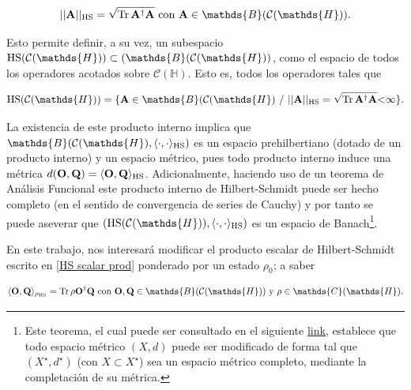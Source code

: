 \documentclass{report} %
\newcommand{\lgg}{\langle}
\newcommand{\rgg}{\rangle}
\numberwithin{equation}{section}
\begin{document}
\begin{equation}
    ||{\bf A}||_{\textnormal{HS}} = \sqrt{\Tr \bf A^{\dagger}{\bf A}} \textnormal{ con } {\bf A} \in \mathds{B}(\mathcal{C}(\mathds{H})).
    \label{HS norm}
\end{equation}

Esto permite definir, a su vez, un subespacio \cite{BCHallp} $\textnormal{HS}(\mathcal{C}(\mathds{H})) \subset (\mathds{B}(\mathcal{C}(\mathds{H}))$, como el espacio de todos los operadores acotados sobre $\mathcal{C}(\mathds{H})$. Esto es, todos los operadores tales que 

$$
\textnormal{HS}(\mathcal{C}(\mathds{H})) = \{{\bf A} \in \mathds{B}(\mathcal{C}(\mathds{H}) \textnormal{ / } ||{\bf A}||_{\textnormal{HS}} = \sqrt{\Tr \bf A^{\dagger}{\bf A}} \mbox{\textless} \infty \}.
$$

La existencia de este producto interno implica que $\mathds{B}(\mathcal{C}(\mathds{H}), \lgg\cdot,\cdot\rgg_{\textnormal{HS}})$ es un espacio prehilbertiano (dotado de un producto interno) \cite{HoracioI} y un espacio métrico, pues todo producto interno induce una métrica $d(\mathbf{O},\mathbf{Q}) = \lgg\mathbf{O}, \mathbf{Q}\rgg_{\textnormal{HS}}$. Adicionalmente, haciendo uso de un teorema de Análisis Funcional \cite{HoracioI} este producto interno de Hilbert-Schmidt puede ser hecho completo (en el sentido de convergencia de series de Cauchy) y por tanto se puede aseverar que  $(\textnormal{HS}(\mathcal{C}(\mathds{H})), \lgg\cdot,\cdot\rgg_{\textnormal{HS}})$ es un espacio de Banach\footnote{Este teorema, el cual puede ser consultado en el siguiente \hyperlink{https://webspace.maths.qmul.ac.uk/m.jerrum/MTH6126/note6.pdf}{link}, establece que todo espacio métrico $(X,d)$ puede ser modificado de forma tal que $(X^{\star},d^{\star})$ (con $X \subset X^{\star}$) sea un espacio métrico completo, mediante la completación de su métrica.}. 

En este trabajo, nos interesará modificar el producto escalar de Hilbert-Schmidt escrito en \eqref{HS scalar prod} ponderado por un estado $\rho_0$; a saber

\begin{equation}
    \lgg\mathbf{O},\mathbf{Q}\rgg_{\rho_{\textnormal{HS}}}= \Tr\rho \mathbf{O}^{\dagger}\mathbf{Q} \textnormal{ con } \mathbf{O}, \mathbf{Q}\in \mathds{B}(\mathcal{C}(\mathds{H})) \textnormal{ y } \rho \in \mathds{C}(\mathds{H})
    \label{HS scalar prod pond}.
\end{equation}
\end{document}
